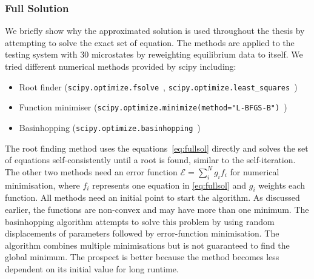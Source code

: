 \subsubsection{Full Solution}
We briefly show why the approximated solution is used throughout the thesis by attempting to solve the exact set of equation. The methods are applied to the testing system with 30 microstates by reweighting equilibrium data to itself.  We tried different numerical methods provided by scipy including:
\begin{itemize}
 \item Root finder (\lstinline{scipy.optimize.fsolve}~\cite{more1980user},
 \lstinline{scipy.optimize.least_squares}~\cite{branch1999subspace})
 \item Function minimiser (\lstinline{scipy.optimize.minimize(method="L-BFGS-B")}~\cite{zhu1997algorithm})
 \item Basinhopping (\lstinline{scipy.optimize.basinhopping}~\cite{wales1997global})
\end{itemize}
The root finding method uses the equations~\ref{eq:fullsol} directly and solves the set of equations self-consistently until a root is found, similar to the self-iteration. The other two methods need an error function $\mathcal{E} = \sum_i^N g_i f_i$ for numerical minimisation, where $f_i$ represents one equation in \ref{eq:fullsol} and $g_i$ weights each function. All methods need an initial point to start the algorithm.  As discussed earlier, the functions are non-convex and may have more than one minimum. The basinhopping algorithm attempts to solve this problem by using random displacements of parameters followed by error-function minimisation. The algorithm combines multiple minimisations but is not guaranteed to find the global minimum. The prospect is better because the method becomes less dependent on its initial value for long runtime. 

